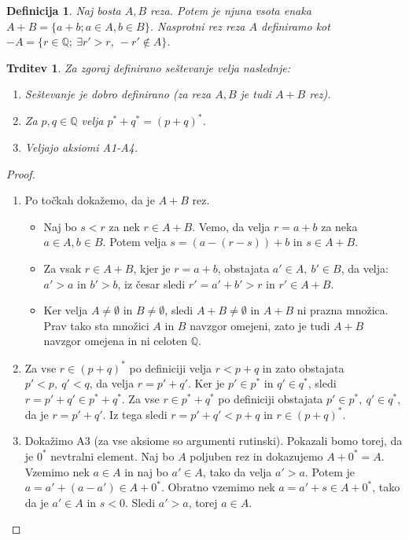 \documentclass[10pt, a4paper]{article}
\newtheorem{trditev}[izr]{Trditev}
\newtheorem{defi}[izr]{Definicija}
\newenvironment{noticeB}{%
  \tcolorbox[%
  notitle,
  empty,
  enhanced,  %
  breakable,
  coltext=black,
  colback=white, 
  fontupper=\rmfamily,
  noparskip,
  sharp corners,
  boxrule=-1pt,  %
  frame hidden,
  left=7pt,  %
  right=7pt,
  top=5pt,
  bottom=5pt,
  before skip=2.5ex plus 2pt,
  after skip=2.5ex plus 2pt,
  borderline west = {1.5pt}{-0.1pt}{blue!30!black}, %
  overlay unbroken and last={%
    \draw[color=black, line width=1.25pt]
    ($(frame.south west)+(1.pt, -0.1pt)$) -- ++(2em, 0);
  }
  ]}
{\endtcolorbox}
\newenvironment{definicija}{\begin{noticeB}\begin{defi}}{%
\end{defi}\end{noticeB}}
\newenvironment{noticeC}{%
  \tcolorbox[%
  notitle,
  empty,
  enhanced,  %
  breakable,
  coltext=black, 
  fontupper=\rmfamily,
  noparskip,
  sharp corners,
  boxrule=-1pt,  %
  frame hidden,
  left=7pt,  %
  right=7pt,
  top=5pt,
  bottom=5pt,
  before skip=2.5ex plus 2pt,
  after skip=2.5ex plus 2pt,
  overlay unbroken and last={%
  },
  ]}
{\endtcolorbox}
\newenvironment{dokaz}%
  {\begin{noticeC}\begin{proof}}%
  {\end{proof}\end{noticeC}}
\newcommand{\Q}{\mathbb {Q}}
\begin{document}
\begin{definicija}
    Naj bosta $A,B$ reza. Potem je njuna vsota enaka $A + B = \{a+b; a\in A, b\in B\}$.
    {Nasprotni rez} reza $A$ definiramo kot $-A = \{r \in \Q;\ \exists r' > r,\ -r' \notin A\}$.
\end{definicija}

\begin{trditev}
    Za zgoraj definirano seštevanje velja naslednje:
    \begin{enumerate}
        \item Seštevanje je dobro definirano (za reza $A, B$ je tudi $A + B$ rez).
        \item Za $p,q \in \Q$ velja $p^{*} + q^{*} = (p+q)^{*}$. 
        \item Veljajo aksiomi A1-A4.
    \end{enumerate}
\end{trditev}


\begin{dokaz}
    \begin{enumerate}
        \item Po točkah dokažemo, da je $A+B$ rez.
        \begin{itemize}
            \item Naj bo $s<r$ za nek $r \in A+B$. Vemo, da velja $r = a+b$ za neka $a \in A, b \in B$. Potem velja $s = (a - (r-s)) + b$ in $s \in A + B$.
            \item Za vsak $r \in A+B$, kjer je $r = a + b$, obstajata $a' \in A,\ b' \in B$, da velja: $a' > a$ in $b' > b$, iz česar sledi $r' = a' + b' > r$ in $r' \in A + B$.
            \item Ker velja $A \neq \emptyset$ in $B \neq \emptyset$, sledi $A+B \neq \emptyset$ in $A+B$ ni prazna množica. 
            Prav tako sta množici $A$ in $B$ navzgor omejeni, zato je tudi $A + B$ navzgor omejena in ni celoten $\Q$. 
        \end{itemize}
        \item Za vse $r \in (p+q)^{*}$ po definiciji velja $r < p+q$ in zato obstajata $p'< p,\ q'< q$, da velja $r = p' + q'$. 
        Ker je $p' \in p^{*}$ in $q' \in q^{*}$, sledi $r = p' + q' \in p^{*}+q^{*}$.
        Za vse $r \in p^{*} + q^{*}$ po definiciji obstajata $p' \in p^{*},\ q' \in q^{*}$, da je $r = p' + q'$. 
        Iz tega sledi $r = p' + q' < p + q$ in $r \in (p + q)^{*}$.
        \item Dokažimo A3 (za vse aksiome so argumenti rutinski). Pokazali bomo torej, da je $0^*$ nevtralni element. Naj bo $A$ poljuben rez in dokazujemo $A + 0^* = A$.
        Vzemimo nek $a \in A$ in naj bo $a' \in A$, tako da velja $a' > a$. Potem je $a = a' + (a - a') \in A + 0^*$.
        Obratno vzemimo nek $a = a' + s \in A + 0^*$, tako da je $a' \in A$ in $s < 0$. Sledi $a' > a$, torej $a \in A$. \qedhere
    \end{enumerate}
\end{dokaz}
\end{document}
